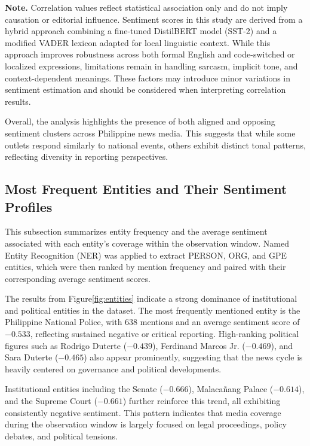 \documentclass[sigconf, nonacm]{acmart}
\begin{document}
\textbf{Note.}
Correlation values reflect statistical association only and do not imply causation or editorial influence. Sentiment scores in this study are derived from a hybrid approach combining a fine-tuned DistilBERT model (SST-2) and a modified VADER lexicon adapted for local linguistic context. While this approach improves robustness across both formal English and code-switched or localized expressions, limitations remain in handling sarcasm, implicit tone, and context-dependent meanings. These factors may introduce minor variations in sentiment estimation and should be considered when interpreting correlation results.

Overall, the analysis highlights the presence of both aligned and opposing sentiment clusters across Philippine news media. This suggests that while some outlets respond similarly to national events, others exhibit distinct tonal patterns, reflecting diversity in reporting perspectives.


\subsection{Most Frequent Entities and Their Sentiment Profiles}

This subsection summarizes entity frequency and the average sentiment associated with each entity’s coverage within the observation window. Named Entity Recognition (NER) was applied to extract PERSON, ORG, and GPE entities, which were then ranked by mention frequency and paired with their corresponding average sentiment scores.

The results from Figure\ref{fig:entities} indicate a strong dominance of institutional and political entities in the dataset. The most frequently mentioned entity is the Philippine National Police, with 638 mentions and an average sentiment score of $-0.533$, reflecting sustained negative or critical reporting. High-ranking political figures such as Rodrigo Duterte ($-0.439$), Ferdinand Marcos Jr. ($-0.469$), and Sara Duterte ($-0.465$) also appear prominently, suggesting that the news cycle is heavily centered on governance and political developments.

Institutional entities including the Senate ($-0.666$), Malacañang Palace ($-0.614$), and the Supreme Court ($-0.661$) further reinforce this trend, all exhibiting consistently negative sentiment. This pattern indicates that media coverage during the observation window is largely focused on legal proceedings, policy debates, and political tensions.
\end{document}
